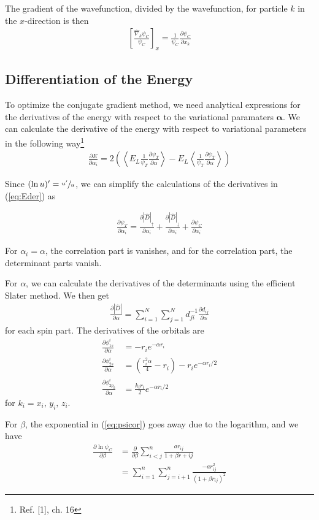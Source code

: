 \documentclass[twocolumns, a4paper,11pt,fleqn]{extarticle}
\newcommand{\eq}[1]{{\small\begin{align*}#1\end{align*}}}
\newcommand{\equ}[1]{{\small\begin{align}#1\end{align}}}
\renewcommand\vec[1]{\boldsymbol{\mathbf{#1}}}
\newcommand{\op}[1]{\hat{#1}}
\begin{document}
The gradient of the wavefunction, 
divided by the wavefunction, for particle $k$ in the $x$-direction is then
\eq{
  \left[\frac{\op\nabla_k\psi_C}{\psi_C}\right]_x 
  =\frac{1}{\psi_C}\frac{\partial\psi_C}{\partial x_k}
}

\subsection{Differentiation of the Energy}

To optimize the conjugate gradient method, we need analytical expressions
for the derivatives of the energy with respect to the variational paramaters
$\vec \alpha$.
We can calculate the derivative of the energy with respect
to variational parameters in the following way\footnote{Ref. [1], ch. 16}
\equ{
  \frac{\partial E}{\partial \alpha_i} =
  2 \left(
  \left\langle  
  E_L\frac{1}{\psi_T}\frac{\partial \psi_T}{\partial \alpha}
  \right\rangle
  - E_L \left\langle  
  \frac{1}{\psi_T}\frac{\partial \psi_T}{\partial \alpha}
  \right\rangle
  \right)\label{eq:Eder}
}

Since $(\ln u)' = \sfrac{u'}{u}$, we can simplify the calculations of the derivatives
in (\ref{eq:Eder}) as

\eq{
  \frac{\partial \psi_T}{\partial \alpha_i}
  =\frac{\partial |\op D|_{\uparrow}}{\partial \alpha_i}
  +\frac{\partial |\op D|_{\downarrow}}{\partial \alpha_i}
  +\frac{\partial \psi_C}{\partial \alpha_i}
}

For $\alpha_i = \alpha$, the correlation part is vanishes,
and for the correlation part, the determinant parts vanish.

For $\alpha$, we can calculate the derivatives of the determinants 
using the efficient Slater method.
We then get
\eq{
  \frac{\partial|\op D|}{\partial \alpha}
  =\sum_{i=1}^N \sum_{j=1}^N  d_{ji}^{-1}\frac{\partial d_{ij}}{\partial \alpha}
}
for each spin part.
The derivatives of the orbitals are
\eq{
  \frac{\partial \phi_{1s}^i}{\partial \alpha} &= -r_i e^{-\alpha r_i}\\
  \frac{\partial \phi_{2s}^i}{\partial \alpha} &= 
  \left(
    \frac{r_i^2\alpha}{4}-r_i
  \right)-r_i e^{-\alpha r_i/2}\\
  \frac{\partial \phi_{2p_k}^i}{\partial \alpha} &= \frac{k_i r_i}{2}e^{-\alpha r_i/2}
}
for $k_i=x_i,\,y_i,\,z_i$.

For $\beta$, the exponential in (\ref{eq:psicor}) 
goes away due to the logarithm, and we have
\eq{
  \frac{\partial \ln \psi_C}{\partial \beta}
  &=\frac{\partial}{\partial \beta}\sum_{i<j}^n
    \frac{a r_{ij}}{1+\beta r+{ij}}\\
    &= \sum_{i=1}^n \sum_{j=i+1}^n \frac{-a r_{ij}^2}{(1+\beta r_{ij})^2}
}
\end{document}
